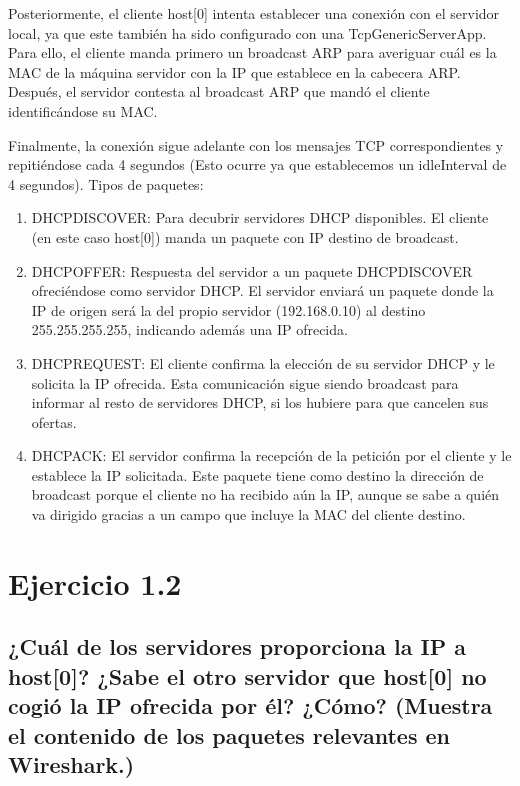 Posteriormente, el cliente host[0] intenta establecer una conexión con el servidor local, ya que este también ha sido configurado con una TcpGenericServerApp. Para ello, el cliente manda primero un broadcast ARP para averiguar cuál es la MAC de la máquina servidor con la IP que establece en la cabecera ARP. Después, el servidor contesta al broadcast ARP que mandó el cliente identificándose su MAC.

Finalmente, la conexión sigue adelante con los mensajes TCP correspondientes y repitiéndose cada 4 segundos (Esto ocurre ya que establecemos un idleInterval de 4 segundos).
\newline
\newline
Tipos de paquetes:
\begin{enumerate}
    \item DHCPDISCOVER: Para decubrir servidores DHCP disponibles. El cliente (en este caso host[0]) manda un paquete con IP destino de broadcast.
    \item DHCPOFFER: Respuesta del servidor a un paquete DHCPDISCOVER ofreciéndose como servidor DHCP. El servidor enviará un paquete donde la IP de origen será la del propio servidor (192.168.0.10) al destino 255.255.255.255, indicando además una IP ofrecida.
    \item DHCPREQUEST: El cliente confirma la elección de su servidor DHCP y le solicita la IP ofrecida. Esta comunicación sigue siendo broadcast para informar al resto de servidores DHCP, si los hubiere para que cancelen sus ofertas.
    \item DHCPACK: El servidor confirma la recepción de la petición por el cliente y le establece la IP solicitada. Este paquete tiene como destino la dirección de broadcast porque el cliente no ha recibido aún la IP, aunque se sabe a quién va dirigido gracias a un campo que incluye la MAC del cliente destino.
\end{enumerate}

\newpage

\section{Ejercicio 1.2}
\label{sec:ej12}
\subsection{¿Cuál de los servidores proporciona la IP a host[0]? ¿Sabe el otro servidor que host[0] no cogió la IP ofrecida por él? ¿Cómo? (Muestra el contenido de los paquetes relevantes en Wireshark.)}

